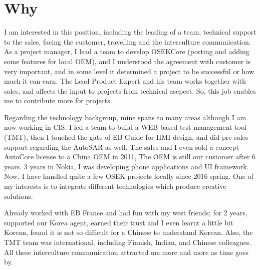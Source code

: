 \section{Why}
I am interested in this position,
including the leading of a team,
technical support to the sales,
facing the customer,
travelling and the interculture communication.
As a project manager, I lead a team to develop OSEKCore (porting and adding some features for local OEM),
and I understood the agreement with customer is very important,
and in some level it determined a project to be successful or how much it can earn.
The Lead Product Expert and his team works together with sales,
and affects the input to projects from technical asepect.
So, this job enables me to contribute more for projects.

Regarding the technology backgroup,
mine spans to many areas although I am now working in CIS.
I led a team to build a WEB based test management tool (TMT),
then I touched the gate of EB Guide for HMI design,
and did pre-sales support regarding the AutoSAR as well.
The sales and I even sold a concept AutoCore license to a China OEM in 2011,
The OEM is still our customer after 6 years.
3 years in Nokia, I was developing phone applications
and UI framework.
Now, I have handled quite a few OSEK projects locally since 2016 spring.
One of my interests is to integrate different technologies
which produce creative solutions.

Already worked with EB France and had fun with my west friends;
for 2 years, supported our Korea agent,
earned their trust and I even learnt a little bit Korean,
found it is not so difficult for a Chinese to understand Korean.
Also, the TMT team was international, including Finnish, Indian, and Chinese colleagues.
All these interculture communication attracted me more and more as time goes by.
